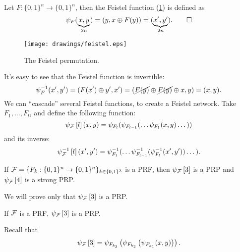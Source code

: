 \begin{definition}[Feistel]
	Let $F: \{0,1\}^n \to \{0,1\}^n$, then the Feistel function (\cref{fig:feistel}) is defined as
	\begin{equation*}
		\Feistel(\underbrace{x,y}_{2n}) = (y, x \xor F(y)) = (\underbrace{x', y'}_{2n}). \qedhere
	\end{equation*}
	\begin{figure}
		\centering
		\texttt{[image: drawings/feistel.eps]}
		\caption{The Feistel permutation.}
		\label{fig:feistel}
	\end{figure}
\end{definition}

It's easy to see that the Feistel function is invertible:
\begin{equation*}
	\Feistel^{-1} (x', y') = (F(x') \xor y', x') = (\cancel{F(y)} \xor \cancel{F(y)} \xor x, y) = (x, y).
\end{equation*}
We can ``cascade'' several Feistel functions, to create a Feistel network.
Take $F_1, \dots, F_l$, and define the following function:
\begin{equation*}
	\Feistel[\F]\left[l\right] (x,y) = \Feistel[F_l](\Feistel[F_{l-1}]( \dots \Feistel[F_{1}](x,y) \dots))
\end{equation*}
and its inverse:
\begin{equation*}
	\Feistel[\F]^{-1}\left[l\right] (x',y') = \Feistel[F_1]^{-1}(\dots \Feistel[F_{l-1}]^{-1}(\Feistel[F_{l}]^{-1}(x',y')) \dots).
\end{equation*}

\begin{theorem}
	If $\F = \{F_k : \{0,1\}^{n} \to \{0,1\}^{n}\}_{k \in \{0,1\}^{\lambda}}$ is a \ac{PRF}, then $\Feistel[\F]\left[3\right]$ is a \ac{PRP} and $\Feistel[\F]\left[4\right]$ is a strong \ac{PRP}.
\end{theorem}

We will prove only that $\Feistel[\F]\left[3\right]$ is a \ac{PRP}.
\begin{theorem} \label{thm:feistel-3-prp}
	If $\F$ is a \ac{PRF}, $\Feistel[\F]\left[3\right]$ is a \ac{PRP}.
\end{theorem}
Recall that 
\begin{equation*}
	\Feistel[\F]\left[3\right] =
	\Feistel[F_{k_3}] \left( \Feistel[F_{k_2}] \left( \Feistel[F_{k_1}] (x,y) \right) \right).
\end{equation*}

